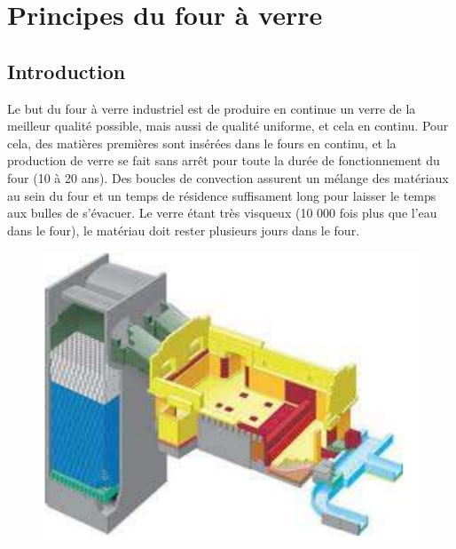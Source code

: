 \documentclass[12pt, a4paper, french, BCOR = 0pt, DIV = 10]{scrartcl}
\begin{document}
    \section{Principes du four à verre}
    \subsection{Introduction}
    Le but du four à verre industriel est de produire en continue un verre de la meilleur qualité possible, mais aussi de qualité uniforme, et cela en continu. Pour cela, des matières premières sont insérées dans le fours en continu, et la production de verre se fait sans arrêt pour toute la durée de fonctionnement du four (10 à 20 ans). Des boucles de convection assurent un mélange des matériaux au sein du four et un temps de résidence suffisament long pour laisser le temps aux bulles de s'évacuer. Le verre étant très visqueux (10 000 fois plus que l'eau dans le four), le matériau doit rester plusieurs jours dans le four.
    
    \begin{center}
        \begin{figure}[h]
            \includegraphics[width=\linewidth]{FourAVerre.png}
        \end{figure}
    \end{center}
\end{document}
